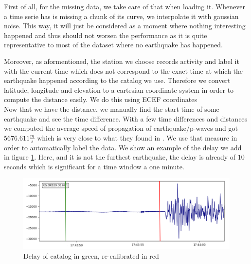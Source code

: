 \documentclass[10pt,conference,compsocconf]{IEEEtran}
\begin{document}
First of all, for the missing data, we take care of that when loading it. Whenever a time serie has is missing a chunk of its curve, we interpolate it with gaussian noise. This way, it will just be considered as a moment where nothing interesting happened and thus should not worsen the performance as it is quite representative to most of the dataset where no earthquake has happened.

Moreover, as aformentioned, the station we choose records activity and label it with the current time which does not correspond to the exact time at which the earthquake happened according to the catalog we use. Therefore we convert latitude, longitude and elevation to a cartesian coordinate system in order to compute the distance easily. We do this using ECEF coordinates\cite{ECEFPaper}\\
Now that we have the distance, we manually find the start time of some earthquake and see the time difference. With a few time differences and distances we computed the average speed of propagation of earthquake/p-waves and got $5676.611\frac{m}{s}$ which is very close to what they found in \cite{PWavePaper}. We use that measure in order to automatically label the data. We show an example of the delay we add in figure \ref{fig:timediff}. Here, and it is not the furthest earthquake, the delay is already of $10$ seconds which is significant for a time window a one minute.

\begin{figure}[h]
  \centering
	\includegraphics[width=\columnwidth]{time-diff.png}
  \caption{Delay of catalog in green, re-calibrated in red}
	\label{fig:timediff}
\end{figure}
\end{document}
